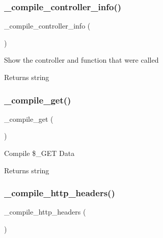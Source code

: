 \subsubsection{\texorpdfstring{\+\_\+compile\+\_\+controller\+\_\+info()}{\_compile\_controller\_info()}}
{\footnotesize\ttfamily \+\_\+compile\+\_\+controller\+\_\+info (\begin{DoxyParamCaption}{ }\end{DoxyParamCaption})\hspace{0.3cm}{\ttfamily [protected]}}

Show the controller and function that were called

\begin{DoxyReturn}{Returns}
string 
\end{DoxyReturn}
\mbox{\label{class_c_i___profiler_a94ef351d1234fe87ee3f5cd7c855f8a5}} 
\subsubsection{\texorpdfstring{\+\_\+compile\+\_\+get()}{\_compile\_get()}}
{\footnotesize\ttfamily \+\_\+compile\+\_\+get (\begin{DoxyParamCaption}{ }\end{DoxyParamCaption})\hspace{0.3cm}{\ttfamily [protected]}}

Compile \$\+\_\+\+G\+ET Data

\begin{DoxyReturn}{Returns}
string 
\end{DoxyReturn}
\mbox{\label{class_c_i___profiler_a80a22812f0243b3daaf78e3614bddadb}} 
\subsubsection{\texorpdfstring{\+\_\+compile\+\_\+http\+\_\+headers()}{\_compile\_http\_headers()}}
{\footnotesize\ttfamily \+\_\+compile\+\_\+http\+\_\+headers (\begin{DoxyParamCaption}{ }\end{DoxyParamCaption})\hspace{0.3cm}{\ttfamily [protected]}}

